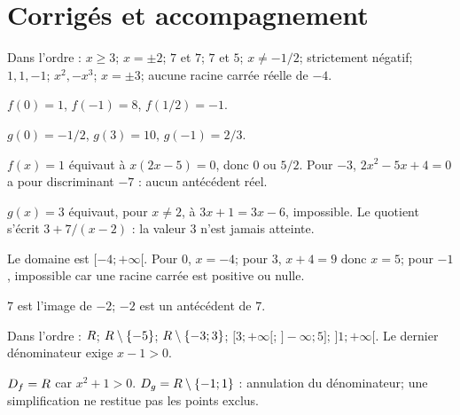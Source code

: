 \ifbmtprof\section*{Corrigés et accompagnement}\fi
\begin{corrige}[automatismes]\label{sol-t11s-c01-auto}
Dans l’ordre : $x\ge3$; $x=\pm2$; $7$ et $7$; $7$ et $5$; $x\ne-1/2$; strictement négatif; $1,1,-1$; $x^2,-x^3$; $x=\pm3$; aucune racine carrée réelle de $-4$.
\end{corrige}
\begin{corrige}\label{sol-t11s-c01-e01}$f(0)=1$, $f(-1)=8$, $f(1/2)=-1$.
\end{corrige}
\begin{corrige}\label{sol-t11s-c01-e02}$g(0)=-1/2$, $g(3)=10$, $g(-1)=2/3$.
\end{corrige}
\begin{corrige}\label{sol-t11s-c01-e03}$f(x)=1$ équivaut à $x(2x-5)=0$, donc $0$ ou $5/2$. Pour $-3$, $2x^2-5x+4=0$ a pour discriminant $-7$ : aucun antécédent réel.
\end{corrige}
\begin{corrige}\label{sol-t11s-c01-e04}$g(x)=3$ équivaut, pour $x\ne2$, à $3x+1=3x-6$, impossible. Le quotient s’écrit $3+7/(x-2)$ : la valeur $3$ n’est jamais atteinte.
\end{corrige}
\begin{corrige}\label{sol-t11s-c01-e05}Le domaine est $[-4;+\infty[$. Pour $0$, $x=-4$; pour $3$, $x+4=9$ donc $x=5$; pour $-1$, impossible car une racine carrée est positive ou nulle.
\end{corrige}
\begin{corrige}\label{sol-t11s-c01-e06}$7$ est l’image de $-2$; $-2$ est un antécédent de $7$.
\end{corrige}
\begin{corrige}\label{sol-t11s-c01-e07}Dans l’ordre : $R$; $R\setminus\{-5\}$; $R\setminus\{-3;3\}$; $[3;+\infty[$; $]-\infty;5]$; $]1;+\infty[$. Le dernier dénominateur exige $x-1>0$.
\end{corrige}
\begin{corrige}\label{sol-t11s-c01-e08}$D_f=R$ car $x^2+1>0$. $D_g=R\setminus\{-1;1\}$ : annulation du dénominateur; une simplification ne restitue pas les points exclus.
\end{corrige}
